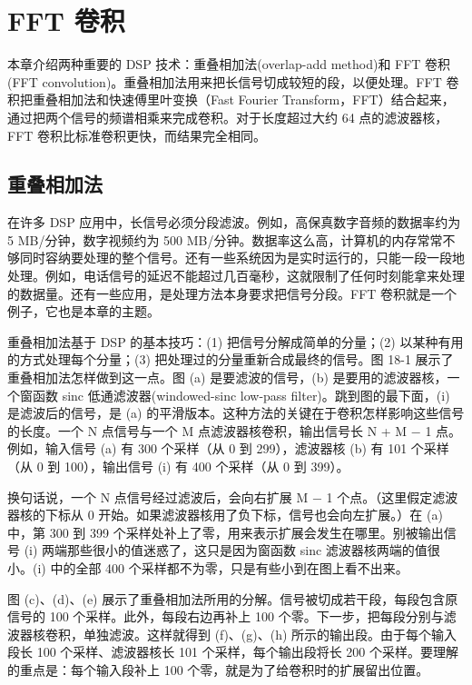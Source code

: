 
\chapter{FFT 卷积}\label{ch-18}

本章介绍两种重要的 DSP 技术：重叠相加法(overlap-add method)和 FFT
卷积(FFT convolution)。重叠相加法用来把长信号切成较短的段，以便处理。FFT
卷积把重叠相加法和快速傅里叶变换（Fast Fourier
Transform，FFT）结合起来，通过把两个信号的频谱相乘来完成卷积。对于长度超过大约
64 点的滤波器核，FFT 卷积比标准卷积更快，而结果完全相同。

\section{重叠相加法}

在许多 DSP 应用中，长信号必须分段滤波。例如，高保真数字音频的数据率约为
5 MB/分钟，数字视频约为 500
MB/分钟。数据率这么高，计算机的内存常常不够同时容纳要处理的整个信号。还有一些系统因为是实时运行的，只能一段一段地处理。例如，电话信号的延迟不能超过几百毫秒，这就限制了任何时刻能拿来处理的数据量。还有一些应用，是处理方法本身要求把信号分段。FFT
卷积就是一个例子，它也是本章的主题。

重叠相加法基于 DSP 的基本技巧：(1) 把信号分解成简单的分量；(2)
以某种有用的方式处理每个分量；(3) 把处理过的分量重新合成最终的信号。图
18-1 展示了重叠相加法怎样做到这一点。图 (a) 是要滤波的信号，(b)
是要用的滤波器核，一个窗函数 sinc 低通滤波器(windowed-sinc low-pass
filter)。跳到图的最下面，(i) 是滤波后的信号，是 (a)
的平滑版本。这种方法的关键在于卷积怎样影响这些信号的长度。一个 N
点信号与一个 M 点滤波器核卷积，输出信号长 N + M − 1 点。例如，输入信号
(a) 有 300 个采样（从 0 到 299），滤波器核 (b) 有 101 个采样（从 0 到
100），输出信号 (i) 有 400 个采样（从 0 到 399）。

换句话说，一个 N 点信号经过滤波后，会向右扩展 M − 1
个点。（这里假定滤波器核的下标从 0
开始。如果滤波器核用了负下标，信号也会向左扩展。）在 (a) 中，第 300 到
399 个采样处补上了零，用来表示扩展会发生在哪里。别被输出信号 (i)
两端那些很小的值迷惑了，这只是因为窗函数 sinc 滤波器核两端的值很小。(i)
中的全部 400 个采样都不为零，只是有些小到在图上看不出来。

图 (c)、(d)、(e)
展示了重叠相加法所用的分解。信号被切成若干段，每段包含原信号的 100
个采样。此外，每段右边再补上 100
个零。下一步，把每段分别与滤波器核卷积，单独滤波。这样就得到
(f)、(g)、(h) 所示的输出段。由于每个输入段长 100 个采样、滤波器核长 101
个采样，每个输出段将长 200 个采样。要理解的重点是：每个输入段补上 100
个零，就是为了给卷积时的扩展留出位置。

